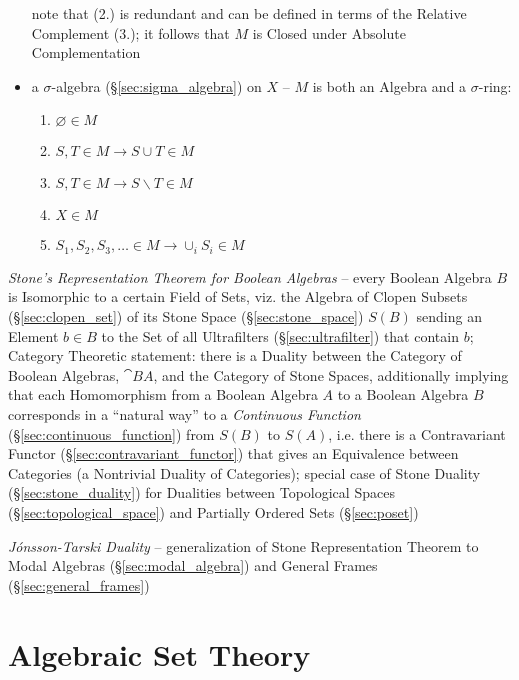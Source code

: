 \begin{itemize}
    note that (2.) is redundant and can be defined in terms of the Relative
    Complement (3.); it follows that $M$ is Closed under Absolute
    Complementation
  \item a $\sigma$-algebra (\S\ref{sec:sigma_algebra}) on $X$ -- $M$ is both an
    Algebra and a $\sigma$-ring:
    \begin{enumerate}
      \item $\varnothing \in M$
      \item $S, T \in M \to S \cup T \in M$
      \item $S, T \in M \to S \backslash T \in M$
      \item $X \in M$
      \item $S_1, S_2, S_3, \ldots \in M \to \cup_i S_i \in M$
    \end{enumerate}
\end{itemize}

\emph{Stone's Representation Theorem for Boolean Algebras} -- every Boolean
Algebra $B$ is Isomorphic to a certain Field of Sets, viz. the Algebra of Clopen
Subsets (\S\ref{sec:clopen_set}) of its Stone Space (\S\ref{sec:stone_space})
$\xspace{S}(B)$ sending an Element $b \in B$ to the Set of all Ultrafilters
(\S\ref{sec:ultrafilter}) that contain $b$; Category Theoretic statement: there
is a Duality between the Category of Boolean Algebras, $\cat{BA}$, and the
Category of Stone Spaces, additionally implying that each Homomorphism from a
Boolean Algebra $A$ to a Boolean Algebra $B$ corresponds in a ``natural way'' to
a \emph{Continuous Function} (\S\ref{sec:continuous_function}) from $S(B)$ to
$S(A)$, i.e. there is a Contravariant Functor
(\S\ref{sec:contravariant_functor}) that gives an Equivalence between Categories
(a Nontrivial Duality of Categories); special case of Stone Duality
(\S\ref{sec:stone_duality}) for Dualities between Topological Spaces
(\S\ref{sec:topological_space}) and Partially Ordered Sets (\S\ref{sec:poset})

\fist \emph{J\'onsson-Tarski Duality} --
generalization of Stone Representation Theorem to Modal Algebras
(\S\ref{sec:modal_algebra}) and General Frames (\S\ref{sec:general_frames})



\section{Algebraic Set Theory}\label{sec:algebraic_set_theory}

